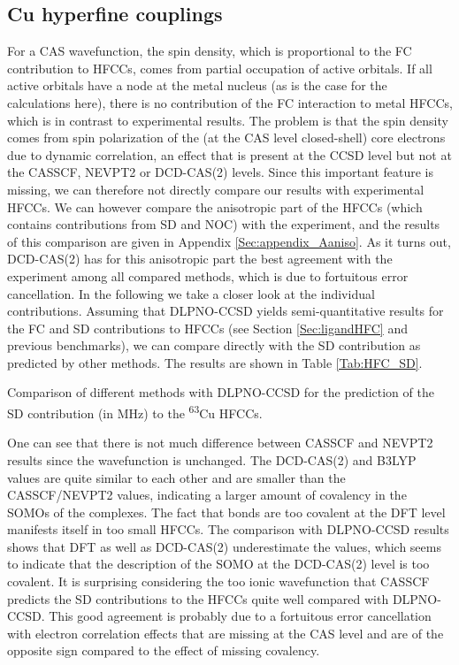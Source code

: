 \subsection{Cu hyperfine couplings}
For a CAS wavefunction, the spin density, which is proportional to the FC contribution to HFCCs, comes from partial occupation of active orbitals. If all active orbitals have a node at the metal nucleus (as is the case for the calculations here), there is no contribution of the FC interaction to metal HFCCs, which is in contrast to experimental results. The problem is that the spin density comes from spin polarization of the (at the CAS level closed-shell) core electrons due to dynamic correlation, an effect that is present at the CCSD level but not at the CASSCF, NEVPT2 or DCD-CAS(2) levels. Since this important feature is missing, we can therefore not directly compare our results with experimental HFCCs. We can however compare the anisotropic part of the HFCCs (which contains contributions from SD and NOC) with the experiment, and the results of this comparison are given in Appendix \ref{Sec:appendix_Aaniso}. As it turns out, DCD-CAS(2) has for this anisotropic part the best agreement with the experiment among all compared methods, which is due to fortuitous error cancellation.
In the following we take a closer look at the individual contributions. Assuming that DLPNO-CCSD yields semi-quantitative results for the FC and SD contributions to HFCCs (see Section \ref{Sec:ligandHFC} and previous benchmarks\cite{SaitoN_2018_34104}), we can compare directly with the SD contribution as predicted by other methods. The results are shown in Table \ref{Tab:HFC_SD}.
\begin{table}
\centering
\small
\caption[SD contribution to the \textsuperscript{63}Cu HFCCs.]{Comparison of different methods with DLPNO-CCSD for the prediction of the SD contribution (in MHz) to the \textsuperscript{63}Cu HFCCs.}
\label{Tab:HFC_SD}

	\end{table}
One can see that there is not much difference between CASSCF and NEVPT2 results since the wavefunction is unchanged. The DCD-CAS(2) and B3LYP values are quite similar to each other and are smaller than the CASSCF/NEVPT2 values, indicating a larger amount of covalency in the SOMOs of the complexes. The fact that bonds are too covalent at the DFT level manifests itself in too small HFCCs. The comparison with DLPNO-CCSD results shows that DFT as well as DCD-CAS(2) underestimate the values, which seems to indicate that the description of the SOMO at the DCD-CAS(2) level is too covalent. It is surprising considering the too ionic wavefunction that CASSCF predicts the SD contributions to the HFCCs quite well compared with DLPNO-CCSD. This good agreement is probably due to a fortuitous error cancellation with electron correlation effects that are missing at the CAS level and are of the opposite sign compared to the effect of missing covalency.
